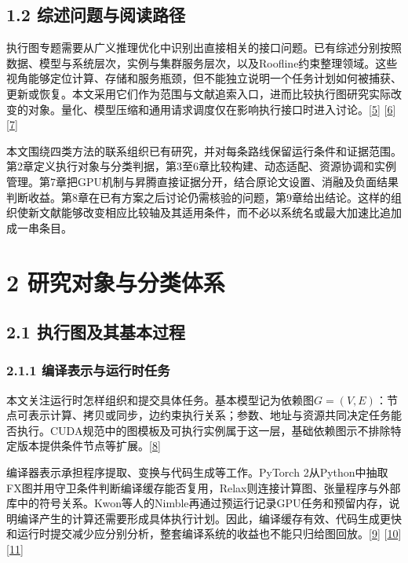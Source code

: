 \documentclass[
  11pt,
  UTF8]{ctexart}
\begin{document}
\hypertarget{section-1-2}{%
\subsection{1.2 综述问题与阅读路径}\label{section-1-2}}

执行图专题需要从广义推理优化中识别出直接相关的接口问题。已有综述分别按照数据、模型与系统层次，实例与集群服务层次，以及Roofline约束整理领域。这些视角能够定位计算、存储和服务瓶颈，但不能独立说明一个任务计划如何被捕获、更新或恢复。本文采用它们作为范围与文献追索入口，进而比较执行图研究实际改变的对象。量化、模型压缩和通用请求调度仅在影响执行接口时进入讨论。{[}\protect\hyperlink{ref-zhou2024survey}{5}{]}
{[}\protect\hyperlink{ref-zhen2025titans}{6}{]}
{[}\protect\hyperlink{ref-yuan2024unveiled}{7}{]}

本文围绕四类方法的联系组织已有研究，并对每条路线保留运行条件和证据范围。第2章定义执行对象与分类判据，第3至6章比较构建、动态适配、资源协调和实例管理。第7章把GPU机制与昇腾直接证据分开，结合原论文设置、消融及负面结果判断收益。第8章在已有方案之后讨论仍需核验的问题，第9章给出结论。这样的组织使新文献能够改变相应比较轴及其适用条件，而不必以系统名或最大加速比追加成一串条目。

\hypertarget{section-2}{%
\section{2 研究对象与分类体系}\label{section-2}}

\hypertarget{section-2-1}{%
\subsection{2.1 执行图及其基本过程}\label{section-2-1}}

\hypertarget{section-2-1-1}{%
\subsubsection{2.1.1 编译表示与运行时任务}\label{section-2-1-1}}

本文关注运行时怎样组织和提交具体任务。基本模型记为依赖图\(G=(V,E)\)：节点可表示计算、拷贝或同步，边约束执行关系；参数、地址与资源共同决定任务能否执行。CUDA规范中的图模板及可执行实例属于这一层，基础依赖图示不排除特定版本提供条件节点等扩展。{[}\protect\hyperlink{ref-nvidia2026cuda1303}{8}{]}

编译器表示承担程序提取、变换与代码生成等工作。PyTorch
2从Python中抽取FX图并用守卫条件判断编译缓存能否复用，Relax则连接计算图、张量程序与外部库中的符号关系。Kwon等人的Nimble再通过预运行记录GPU任务和预留内存，说明编译产生的计算还需要形成具体执行计划。因此，编译缓存有效、代码生成更快和运行时提交减少应分别分析，整套编译系统的收益也不能只归给图回放。{[}\protect\hyperlink{ref-ansel2024pytorch2}{9}{]}
{[}\protect\hyperlink{ref-lai2025relax}{10}{]}
{[}\protect\hyperlink{ref-kwon2020nimble}{11}{]}
\end{document}
